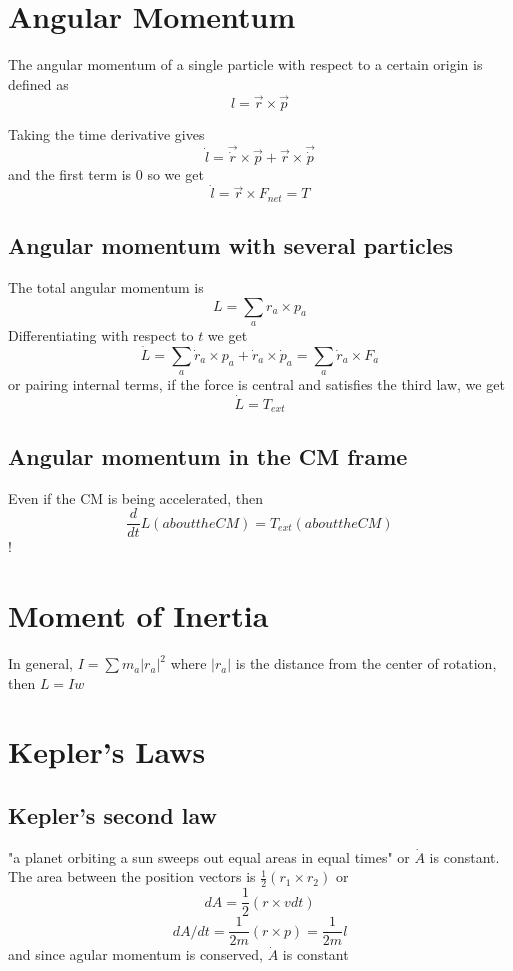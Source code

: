 \documentclass{homework}
\begin{document}
\section{Angular Momentum}

The angular momentum of a single particle with respect to a certain origin is defined as 
\[l = \vec{r} \times \vec{p}\]

Taking the  time derivative gives
\[\dot{l} = \vec{\dot{r}} \times \vec{p} + \vec{r} \times \vec{\dot{p}}\]
and the first term is $0$ so we get
\[\dot{l} = \vec{r} \times F_{net} = T\]

\subsection{Angular momentum with several particles}

The total angular momentum is 
\[L = \sum_{a}r_a \times p_a\]
Differentiating with respect to $t$ we get
\[\dot{L} = \sum_{a}\dot{r}_a \times p_a + \dot{r}_a \times \dot{p}_a = \sum_{a}\dot{r}_a \times F_a\]
or pairing internal terms, if the force is central and satisfies the third law, we get
\[\dot{L} = T_{ext}\]

\subsection{Angular momentum in the CM frame}

Even if the CM is being accelerated, then
\[\frac{d}{dt}L(about the CM) = T_{ext}(about the CM)\]
!

\section{Moment of Inertia}

In general, $I = \sum m_a |r_a|^2$ where $|r_a|$ is the distance from the center of rotation, then $L = Iw$



\section{Kepler's Laws}

\subsection{Kepler's second law}

"a planet orbiting a sun sweeps out equal areas in equal times" or $\dot{A}$ is constant. The area between the position vectors is $\frac{1}{2}(r_1 \times r_2)$ or
\[dA = \frac{1}{2}(r \times v dt)\]
\[dA/dt = \frac{1}{2m}(r \times p) = \frac{1}{2m}l\]
and since agular momentum is conserved, $\dot{A} $ is constant
\end{document}
